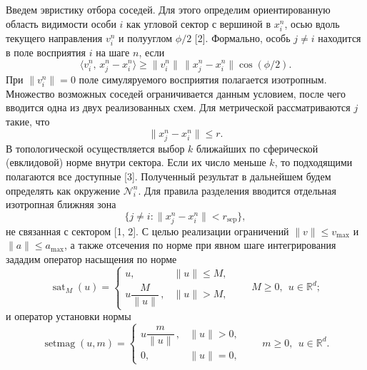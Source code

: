 \documentclass{article}
\begin{document}
Введем эвристику отбора соседей. Для этого определим ориентированную область видимости особи $i$ как угловой сектор с вершиной в $x_i^n$, осью вдоль текущего направления $v_i^n$ и полууглом $\phi/2$ [2]. Формально, особь $j \ne i$ находится в поле восприятия $i$ на шаге $n$, если 
\begin{equation}
    \langle v_i^n,\,x_j^n-x_i^n\rangle \ge \|v_i^n\|\,\|x_j^n-x_i^n\|\cos(\phi/2).
\end{equation}
При $\|v_i^n\|=0$ поле симуляруемого восприятия полагается изотропным. Множество возможных соседей ограничивается данным условием, после чего вводится одна из двух реализованных схем. Для метрической рассматриваются $j$ такие, что 
\begin{equation}
    \|x_j^n-x_i^n\|\le r.
\end{equation}
В топологической  осуществляется выбор $k$ ближайших по сферической (евклидовой) норме внутри сектора. Если их число меньше $k$, то подходящими полагаются все доступные [3]. Полученный результат в дальнейшем будем определять как окружение $\mathcal{N}_i^n$. Для правила разделения вводится отдельная изотропная ближняя зона 
\begin{equation}
    \{j\ne i:\|x_j^n-x_i^n\|<r_{\mathrm{sep}}\},
\end{equation}
не связанная с сектором [1, 2]. С целью реализации ограничений $\|v\|\le v_{\max}$ и $\|a\|\le a_{\max}$, а также  отсечения по норме при явном шаге интегрирования зададим оператор насыщения по норме
\begin{equation}
    \operatorname{sat}_M(u)=
    \begin{cases}
    u, & \|u\|\le M,\\
    u\dfrac{M}{\|u\|}\,, & \|u\|>M,
    \end{cases}
    \qquad M\ge 0,\ \ u\in\mathbb{R}^d;
\end{equation}
и оператор установки нормы
\begin{equation}
    \operatorname{setmag}(u,m)=
    \begin{cases}
    u\dfrac{m}{\|u\|}\,, & \|u\|>0,\\
    0, & \|u\|=0,
    \end{cases}
    \qquad m\ge 0,\ \ u\in\mathbb{R}^d.
\end{equation}
\end{document}
